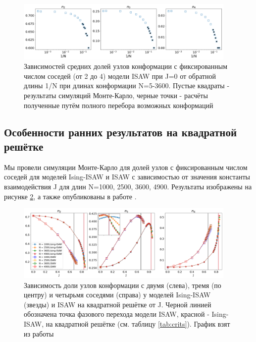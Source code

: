 \begin{figure}[]
    \centering
    \includegraphics[width=0.95\textwidth]{Sections/Images/ISAWJ0_Bulk2-4.png}
    \caption{Зависимостей средних долей узлов конформации с фиксированным числом соседей (от 2 до 4) модели ISAW при J=0 от обратной длины 1/N при длинах конформации N=5-3600. Пустые квадраты - результаты симуляций Монте-Карло, черные точки - расчёты полученные путём полного перебора возможных конформаций\cite{web:sawRepos}}
    \label{fig:ISAW_Bulk_J0}
\end{figure}

\subsection{Особенности ранних результатов на квадратной решётке}

Мы провели симуляции Монте-Карло для долей узлов с фиксированным числом соседей для моделей Ising-ISAW и ISAW с зависимостью от значения константы взаимодействия J для длин N=1000, 2500, 3600, 4900. Результаты изображены на рисунке \ref{fig:Ising_vs_ISAW__2D_bulk}, а также опубликованы в работе \cite{faizullina2021critical}. 

\begin{figure}[h!]
    \centering
    \includegraphics[width=0.95\textwidth]{Sections/Images/bulk2-4_inset.png}
    \caption{Зависимость доли узлов конформации с двумя (слева), тремя (по центру) и четырьмя соседями (справа) у моделей Ising-ISAW (звезды) и ISAW на квадратной решётке от J. Черной линией обозначена точка фазового перехода модели ISAW, красной - Ising-ISAW, на квадратной решётке (см. таблицу \ref{tab:crits}). График взят из работы \cite{faizullina2021critical}}
    \label{fig:Ising_vs_ISAW__2D_bulk}
\end{figure}

